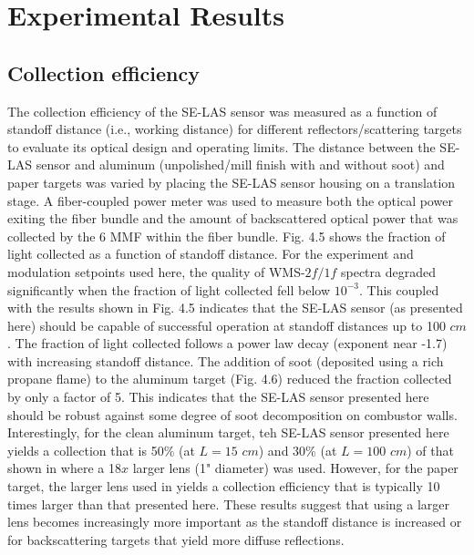 \section{Experimental Results}
\subsection{Collection efficiency}
The collection efficiency of the SE-LAS sensor was measured as a function of standoff distance (i.e., working distance) for different reflectors/scattering targets to evaluate its optical design and operating limits. The distance between the SE-LAS sensor and aluminum (unpolished/mill finish with and without soot) and paper targets was varied by placing the SE-LAS sensor housing on a translation stage. A fiber-coupled power meter was used to measure both the optical power exiting the fiber bundle and the amount of backscattered optical power that was collected by the 6 MMF within the fiber bundle. Fig. 4.5 shows the fraction of light collected as a function of standoff distance. For the experiment and modulation setpoints used here, the quality of WMS-$2f/1f$ spectra degraded significantly when the fraction of light collected fell below $10^{-3}$. This coupled with the results shown in Fig. 4.5 indicates that the SE-LAS sensor (as presented here) should be capable of successful operation at standoff distances up to 100 $cm$. The fraction of light collected follows a power law decay (exponent near -1.7) with increasing standoff distance. The addition of soot (deposited using a rich propane flame) to the aluminum target (Fig. 4.6) reduced the fraction collected by only a factor of 5. This indicates that the SE-LAS sensor presented here should be robust against some degree of soot decomposition on combustor walls. Interestingly, for the clean aluminum target, teh SE-LAS sensor presented here yields a collection that is 50$\%$ (at $L=15$ $cm$) and 30$\%$ (at $L=100$ $cm$) of that shown in \cite{Goldenstein:16} where a 18$x$ larger lens (1" diameter) was used. However, for the paper target, the larger lens used in \cite{Goldenstein:16} yields a collection efficiency that is typically 10 times larger than that presented here. These results suggest that using a larger lens becomes increasingly more important as the standoff distance is increased or for backscattering targets that yield more diffuse reflections.

\vspace{3mm}

